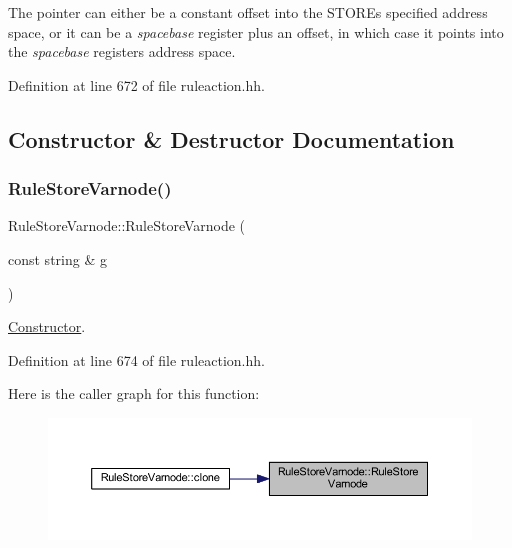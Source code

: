 The pointer can either be a constant offset into the S\+T\+O\+RE\textquotesingle{}s specified address space, or it can be a {\itshape spacebase} register plus an offset, in which case it points into the {\itshape spacebase} register\textquotesingle{}s address space. 

Definition at line 672 of file ruleaction.\+hh.



\subsection{Constructor \& Destructor Documentation}
\mbox{\label{class_rule_store_varnode_a4925355b842b734cb617e0db60ea1c16}} 
\subsubsection{\texorpdfstring{RuleStoreVarnode()}{RuleStoreVarnode()}}
{\footnotesize\ttfamily Rule\+Store\+Varnode\+::\+Rule\+Store\+Varnode (\begin{DoxyParamCaption}\item[{const string \&}]{g }\end{DoxyParamCaption})\hspace{0.3cm}{\ttfamily [inline]}}



\mbox{\hyperlink{class_constructor}{Constructor}}. 



Definition at line 674 of file ruleaction.\+hh.

Here is the caller graph for this function\+:
\nopagebreak
\begin{figure}[H]
\begin{center}
\leavevmode
\includegraphics[width=350pt]{class_rule_store_varnode_a4925355b842b734cb617e0db60ea1c16_icgraph}
\end{center}
\end{figure}


